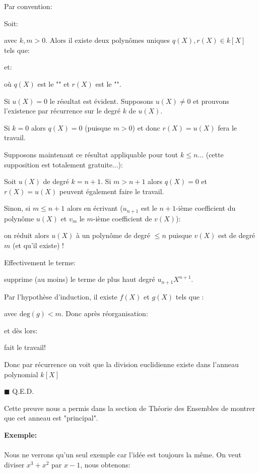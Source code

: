 	\begin{tcolorbox}[title=Remarque,colframe=black,arc=10pt]
	Par convention:
	
	\end{tcolorbox}
	\begin{theorem}
	Soit:
	
	avec $k,m>0$. Alors il existe deux polynômes uniques $q(X),r(X)\in k[X]$ tels que:
	
	et:
	
	où $q(X)$ est le "" et $r(X)$ est le "".
	\end{theorem}
	\begin{dem}
	Si $u (X) = 0$ le résultat est évident. Supposons $u(X)\neq 0$ et prouvons l'existence par récurrence sur le degré $k$ de $u (X)$.
	
	Si $k = 0$ alors $q (X) = 0$ (puisque $m>0$) et donc $r (X) = u (X)$ fera le travail.
	
	Supposons maintenant ce résultat appliquable pour tout $k\leq n$... (cette supposition est totalement gratuite...):
	
	Soit $u(X)$ de degré $k=n+1$. Si $m>n+1$ alors $q (X) = 0$ et $r (X) = u (X)$ peuvent également faire le travail.
	
	Sinon, si $m\leq n+1$ alors en écrivant ($u_{n+1}$ est le $n+1$-ième coefficient du polynôme $u(X)$ et $v_m$ le $m$-ième coefficient de $v(X)$):
	
	on réduit alors $u(X)$ à un polynôme de degré $\leq n$ puisque $v(X)$ est de degré $m$ (et qu'il existe) !
	
	Effectivement le terme:
	
	supprime (au moins) le terme de plus haut degré $u_{n+1}X^{n+1}$.
	
	Par l'hypothèse d'induction, il existe $f(X)$ et $g(X)$ tels que :
	
	avec $\text{deg}(g)<m$. Donc après réorganisation:
	
	et dès lors:
	
	fait le travail!
	
	Donc par récurrence on voit que la division euclidienne existe dans l'anneau polynomial $k[X]$
	\begin{flushright}
		$\blacksquare$  Q.E.D.
	\end{flushright}
	\end{dem}
	\begin{tcolorbox}[title=Remarque,colframe=black,arc=10pt]
	Cette preuve nous a permis dans la section de Théorie des Ensembles de montrer que cet anneau est "principal".
	\end{tcolorbox}
	\begin{tcolorbox}[colframe=black,colback=white,sharp corners]
	\textbf{{\Large {}}Exemple:}\\\\
	Nous ne verrons qu'un seul exemple car l'idée est toujours la même. On veut diviser $x^3+x^2$ par $x-1$, nous obtenons:
		
	\end{tcolorbox}
	
